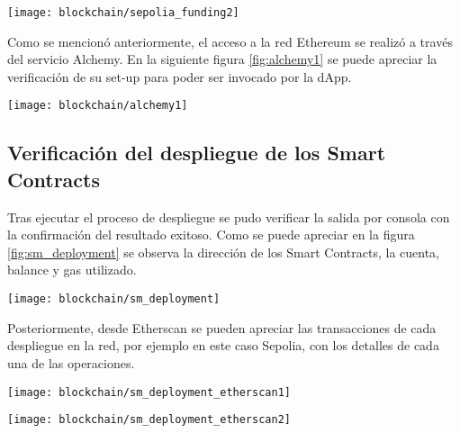 \begin{center}
   \texttt{[image: blockchain/sepolia\_funding2]}
   \label{fig:sepolia_funding2}
\end{center}

Como se mencionó anteriormente, el acceso a la red Ethereum se realizó a través del servicio Alchemy. En la siguiente figura \ref{fig:alchemy1} se puede apreciar la verificación de su set-up para poder ser invocado por la dApp. 


\begin{center}
   \texttt{[image: blockchain/alchemy1]}
   \label{fig:alchemy1}
\end{center}




\subsection{Verificación del despliegue de los Smart Contracts}

Tras ejecutar el proceso de despliegue se pudo verificar la salida por consola con la confirmación del resultado exitoso. Como se puede apreciar en la figura \ref{fig:sm_deployment} se observa la dirección de los Smart Contracts, la cuenta, balance y gas utilizado.


\begin{center}
   \texttt{[image: blockchain/sm\_deployment]}
   \label{fig:sm_deployment}
\end{center}

Posteriormente, desde Etherscan se pueden apreciar las transacciones de cada despliegue en la red, por ejemplo en este caso Sepolia, con los detalles de cada una de las operaciones.

\begin{center}
   \texttt{[image: blockchain/sm\_deployment\_etherscan1]}
   \label{fig:sm_deployment_etherscan1}
\end{center}

\begin{center}
   \texttt{[image: blockchain/sm\_deployment\_etherscan2]}
   \label{fig:sm_deployment_etherscan2}
\end{center}



